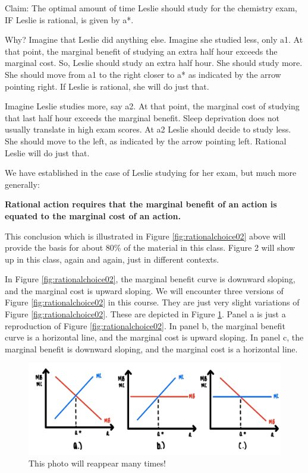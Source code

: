 \documentclass[
]{book}
\begin{document}
Claim: The optimal amount of time Leslie should study for the chemistry exam, IF Leslie is rational, is given by a*.

Why? Imagine that Leslie did anything else. Imagine she studied less, only a1. At that point, the marginal benefit of studying an extra half hour exceeds the marginal cost. So, Leslie should study an extra half hour. She should study more. She should move from a1 to the right closer to a* as indicated by the arrow pointing right. If Leslie is rational, she will do just that.

Imagine Leslie studies more, say a2. At that point, the marginal cost of studying that last half hour exceeds the marginal benefit. Sleep deprivation does not usually translate in high exam scores. At a2 Leslie should decide to study less. She should move to the left, as indicated by the arrow pointing left. Rational Leslie will do just that.

We have established in the case of Leslie studying for her exam, but much more generally:

\begin{iucolor}
\textbf{Rational action requires that the marginal benefit of an action is equated to the marginal cost of an action.}

\end{iucolor}

This conclusion which is illustrated in Figure \ref{fig:rationalchoice02} above will provide the basis for about 80\% of the material in this class. Figure 2 will show up in this class, again and again, just in different contexts.

In Figure \ref{fig:rationalchoice02}, the marginal benefit curve is downward sloping, and the marginal cost is upward sloping. We will encounter three versions of Figure \ref{fig:rationalchoice02} in this course. They are just very slight variations of Figure \ref{fig:rationalchoice02}. These are depicted in Figure \ref{fig:rationalchoice03}. Panel a is just a reproduction of Figure \ref{fig:rationalchoice02}. In panel b, the marginal benefit curve is a horizontal line, and the marginal cost is upward sloping. In panel c, the marginal benefit is downward sloping, and the marginal cost is a horizontal line.

\begin{figure}

{\centering \includegraphics[width=1\linewidth]{img/rationalchoice/panels} 

}

\caption{This photo will reappear many times!}\label{fig:rationalchoice03}
\end{figure}
\end{document}
